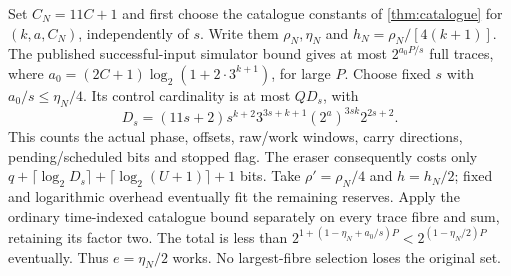 \begin{informalproof}
Set $C_N=11C+1$ and first choose the catalogue constants of
\cref{thm:catalogue} for $(k,a,C_N)$, independently of $s$. Write them
$\rho_N,\eta_N$ and $h_N=\rho_N/[4(k+1)]$. The published successful-input
simulator bound gives at most $2^{a_0P/s}$ full traces, where
$a_0=(2C+1)\log_2(1+2\cdot3^{k+1})$, for large $P$. Choose fixed $s$ with
$a_0/s\le\eta_N/4$. Its control cardinality is at most $QD_s$, with
\[
 D_s=(11s+2)s^{k+2}3^{3s+k+1}(2^a)^{3sk}2^{2s+2}.
\]
This counts the actual phase, offsets, raw/work windows, carry directions,
pending/scheduled bits and stopped flag. The eraser consequently costs only
$q+\lceil\log_2D_s\rceil+\lceil\log_2(U+1)\rceil+1$ bits. Take
$\rho'=\rho_N/4$ and $h=h_N/2$; fixed and logarithmic overhead eventually
fit the remaining reserves. Apply the ordinary time-indexed catalogue bound
separately on every trace fibre and sum, retaining its factor two. The total
is less than $2^{1+(1-\eta_N+a_0/s)P}<2^{(1-\eta_N/2)P}$ eventually.
Thus $e=\eta_N/2$ works. No largest-fibre selection loses the original set.
\end{informalproof}

